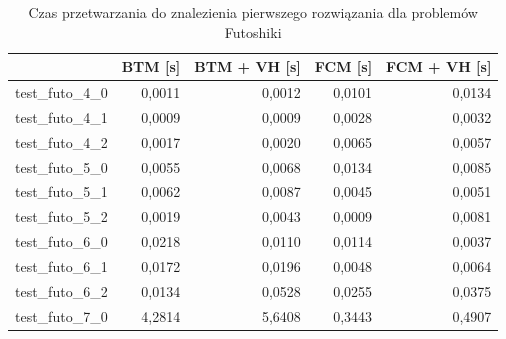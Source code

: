 \documentclass{article}
\begin{document}
\begin{table}[H]
	\caption{Czas przetwarzania do znalezienia pierwszego rozwiązania dla problemów Futoshiki}
	\label{tab:vh_no_mrv}
	\begin{center}
		\begin{tabular}{|l|r|r|r|r|}
			\hline
			& \multicolumn{1}{c|}{\textbf{BTM [s]}} & \multicolumn{1}{l|}{\textbf{BTM + VH [s]}} & \multicolumn{1}{c|}{\textbf{FCM [s]}} & \multicolumn{1}{c|}{\textbf{FCM + VH [s]}} \\ \hline
			test\_futo\_4\_0 & 0,0011                            & 0,0012                                 & 0,0101                            & 0,0134                                 \\ \hline
			test\_futo\_4\_1 & 0,0009                            & 0,0009                                 & 0,0028                            & 0,0032                                 \\ \hline
			test\_futo\_4\_2 & 0,0017                            & 0,0020                                 & 0,0065                            & 0,0057                                 \\ \hline
			test\_futo\_5\_0 & 0,0055                            & 0,0068                                 & 0,0134                            & 0,0085                                 \\ \hline
			test\_futo\_5\_1 & 0,0062                            & 0,0087                                 & 0,0045                            & 0,0051                                 \\ \hline
			test\_futo\_5\_2 & 0,0019                            & 0,0043                                 & 0,0009                            & 0,0081                                 \\ \hline
			test\_futo\_6\_0 & 0,0218                            & 0,0110                                 & 0,0114                            & 0,0037                                 \\ \hline
			test\_futo\_6\_1 & 0,0172                            & 0,0196                                 & 0,0048                            & 0,0064                                 \\ \hline
			test\_futo\_6\_2 & 0,0134                            & 0,0528                                 & 0,0255                            & 0,0375                                 \\ \hline
			test\_futo\_7\_0 & 4,2814                            & 5,6408                                 & 0,3443                            & 0,4907                                 \\ \hline

\end{tabular}
\end{center}
\end{table}
\end{document}
